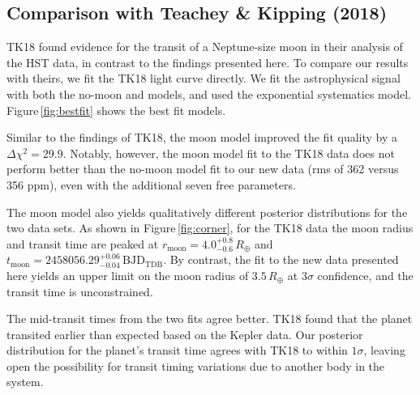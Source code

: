 \documentclass[twocolumn]{aastex62}
\begin{document}
\subsection{Comparison with Teachey \& Kipping (2018)}
TK18 found evidence for the transit of a Neptune-size moon in their analysis of the HST data, in contrast to the findings presented here.  To compare our results with theirs, we fit the TK18 light curve directly.  We fit the astrophysical signal with both the no-moon and models, and used the exponential systematics model.  Figure\,\ref{fig:bestfit} shows the best fit models. 


Similar to the findings of TK18, the moon model improved the fit quality by a $\Delta\chi^2 = 29.9$. Notably, however, the moon model fit to the TK18 data does not perform better than the no-moon model fit to our new data (rms of 362 versus 356 ppm), even with the additional seven free parameters.  

The moon model also yields qualitatively different posterior distributions for the two data sets.  As shown in Figure\,\ref{fig:corner}, for the TK18 data the moon radius and transit time are peaked at $r_\mathrm{moon} = 4.0^{+0.8}_{-0.6}\,R_\oplus$  and $t_\mathrm{moon} =  2458056.29^{+0.06}_{-0.04}\,\mathrm{BJD_{TDB}}$. By contrast, the fit to the new data presented here yields an upper limit on the moon radius of $3.5\,R_\oplus$ at $3\sigma$ confidence, and the transit time is unconstrained.

The mid-transit times from the two fits agree better. TK18 found that the planet transited earlier than expected based on the Kepler data. Our posterior distribution for the planet's transit time agrees with TK18 to within $1\sigma$, leaving open the possibility for transit timing variations due to another body in the system.

\end{document}
